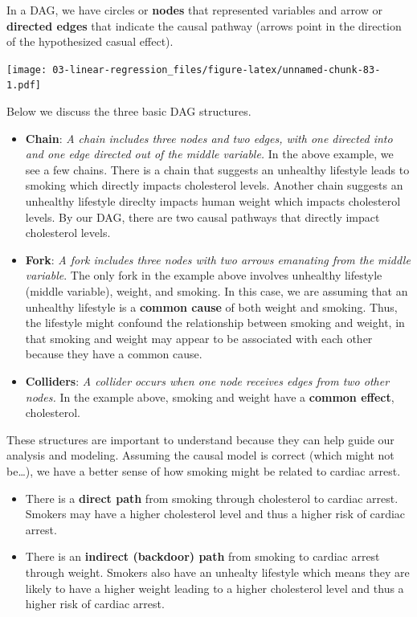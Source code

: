 \documentclass[
]{book}
\providecommand{\tightlist}{%
  \setlength{\itemsep}{0pt}\setlength{\parskip}{0pt}}
\begin{document}
In a DAG, we have circles or \textbf{nodes} that represented variables and arrow or \textbf{directed edges} that indicate the causal pathway (arrows point in the direction of the hypothesized casual effect).

\texttt{[image: 03-linear-regression\_files/figure-latex/unnamed-chunk-83-1.pdf]}

Below we discuss the three basic DAG structures.

\begin{itemize}
\item
  \textbf{Chain}: \emph{A chain includes three nodes and two edges, with one directed into and one edge directed out of the middle variable.} In the above example, we see a few chains. There is a chain that suggests an unhealthy lifestyle leads to smoking which directly impacts cholesterol levels. Another chain suggests an unhealthy lifestyle direclty impacts human weight which impacts cholesterol levels. By our DAG, there are two causal pathways that directly impact cholesterol levels.
\item
  \textbf{Fork}: \emph{A fork includes three nodes with two arrows emanating from the middle variable}. The only fork in the example above involves unhealthy lifestyle (middle variable), weight, and smoking. In this case, we are assuming that an unhealthy lifestyle is a \textbf{common cause} of both weight and smoking. Thus, the lifestyle might confound the relationship between smoking and weight, in that smoking and weight may appear to be associated with each other because they have a common cause.
\item
  \textbf{Colliders}: \emph{A collider occurs when one node receives edges from two other nodes.} In the example above, smoking and weight have a \textbf{common effect}, cholesterol.
\end{itemize}

These structures are important to understand because they can help guide our analysis and modeling. Assuming the causal model is correct (which might not be\ldots), we have a better sense of how smoking might be related to cardiac arrest.

\begin{itemize}
\tightlist
\item
  There is a \textbf{direct path} from smoking through cholesterol to cardiac arrest. Smokers may have a higher cholesterol level and thus a higher risk of cardiac arrest.
\item
  There is an \textbf{indirect (backdoor) path} from smoking to cardiac arrest through weight. Smokers also have an unhealty lifestyle which means they are likely to have a higher weight leading to a higher cholesterol level and thus a higher risk of cardiac arrest.
\end{itemize}
\end{document}
